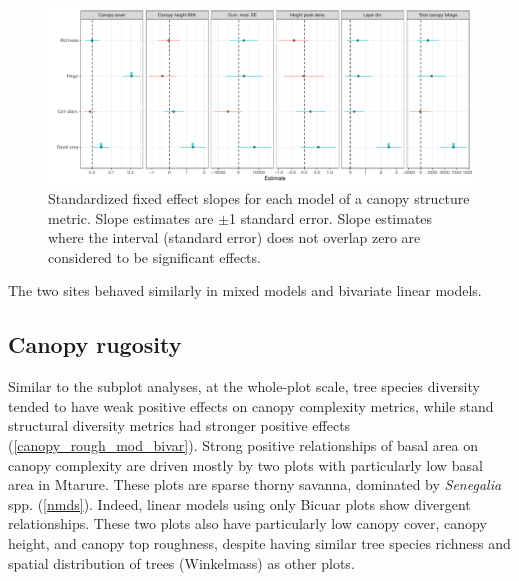\documentclass[11pt,a4paper]{article}
\begin{document}
\begin{figure}[H]
\centering
	\includegraphics[width=\textwidth]{height_profile_mod_rich_slopes}
	\caption{Standardized fixed effect slopes for each model of a canopy structure metric. Slope estimates are $\pm$1 standard error. Slope estimates where the interval (standard error) does not overlap zero are considered to be significant effects.}
	\label{height_profile_mod_rich_slopes}
\end{figure}

The two sites behaved similarly in mixed models and bivariate linear models.

\subsection{Canopy rugosity}

Similar to the subplot analyses, at the whole-plot scale, tree species diversity tended to have weak positive effects on canopy complexity metrics, while stand structural diversity metrics had stronger positive effects (\autoref{canopy_rough_mod_bivar}). Strong positive relationships of basal area on canopy complexity are driven mostly by two plots with particularly low basal area in Mtarure. These plots are sparse thorny savanna, dominated by \textit{Senegalia} spp. (\autoref{nmds}). Indeed, linear models using only Bicuar plots show divergent relationships. These two plots also have particularly low canopy cover, canopy height, and canopy top roughness, despite having similar tree species richness and spatial distribution of trees (Winkelmass) as other plots.
\end{document}
